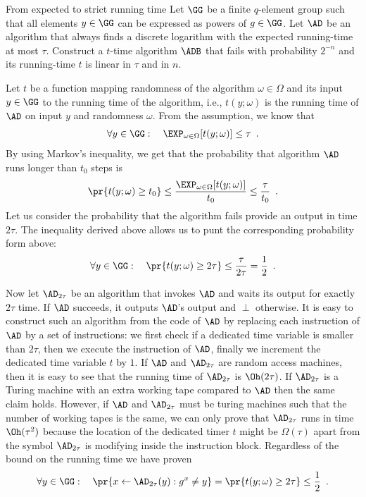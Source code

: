 \documentclass{crypto-exercise}
\author[Formalisation of folklore]{Sven Laur}
\begin{document}
\begin{exercise}{From expected to strict running time}
Let $\GG$ be a finite $q$-element group such that all elements $y\in\GG$ can be expressed as powers of $g\in\GG$. Let $\AD$ be an algorithm that always finds a discrete logarithm with the expected running-time at most $\tau$. Construct a $t$-time algorithm $\ADB$ that fails with probability $2^{-n}$ and its running-time $t$ is linear in $\tau$ and in $n$.
\end{exercise}
  
\begin{solution} 
Let $t$ be a function mapping randomness of the algorithm $\omega\in\Omega$ and its input $y\in\GG$ to the running time of the algorithm, i.e., $t(y;\omega)$ is the running time of $\AD$ on input $y$ and randomness $\omega$. From the assumption, we know that
\begin{align*}
 \forall y\in\GG:\quad \EXP_{\omega\in\Omega}[t(y;\omega)]\leq \tau\enspace.
\end{align*}
By using Markov's inequality, we get that the probability that algorithm $\AD$ runs longer than $t_0$ steps is
\begin{align*}
\pr{t(y;\omega) \geq t_0} \leq \frac{\EXP_{\omega\in\Omega}[t(y;\omega)]}{t_0}\leq\frac{\tau}{t_0}\enspace. 
\end{align*}
Let us consider the probability that the algorithm fails provide an output in time $2 \tau$. The inequality derived above allows us to punt the corresponding probability form above: 
\begin{align*}
\forall y\in \GG:\quad
\pr{t(y;\omega) \geq 2\tau} \leq \frac{\tau}{2\tau} = \frac{1}{2} \enspace.
\end{align*}

Now let $\AD_{2 \tau}$ be an algorithm that invokes $\AD$ and waits its output for exactly $2\tau$ time. If $\AD$ succeeds, it outputs $\AD$'s output and $\perp$ otherwise. It is easy to construct such an algorithm from the code of $\AD$ by replacing each instruction of $\AD$ by a set of instructions: we first check if a dedicated time variable is smaller than $2\tau$, then we execute the instruction of $\AD$, finally we increment the dedicated time variable $t$ by $1$. If $\AD$ and $\AD_{2\tau}$ are  random access machines, then it is easy to see that the running time of $\AD_{2\tau}$ is $\Oh(2\tau)$. If $\AD_{2\tau}$ is a Turing machine with an extra working tape compared to $\AD$ then the same claim holds. However, if $\AD$ and $\AD_{2\tau}$ must be turing machines such that the number of working tapes is the same, we can only prove that $\AD_{2\tau}$ runs in time $\Oh(\tau^2)$    because the location of the dedicated timer $t$ might be $\Omega(\tau)$ apart from the symbol $\AD_{2\tau}$ is modifying inside the instruction block. Regardless of the bound on the running time we have proven
\begin{align*}
\forall y\in\GG:\quad\pr{x\gets\AD_{2\tau}(y): g^x\neq y}=\pr{t(y;\omega) \geq 2\tau}\leq \frac{1}{2}\enspace.
\end{align*} 


\end{solution}
\end{document}
